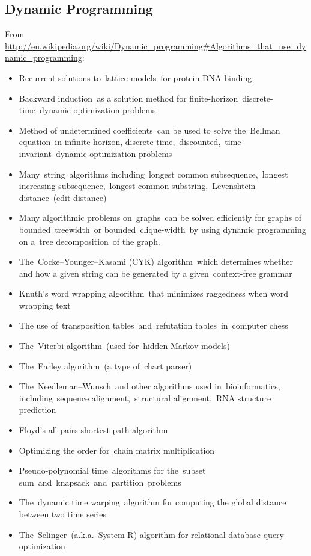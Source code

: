 \subsection{Dynamic Programming}
From \url{http://en.wikipedia.org/wiki/Dynamic_programming#Algorithms_that_use_dynamic_programming}:
\begin{itemize}
\item Recurrent solutions to lattice models for protein-DNA binding
\item Backward induction as a solution method for finite-horizon discrete-time dynamic optimization problems
\item Method of undetermined coefficients can be used to solve the Bellman equation in infinite-horizon, discrete-time, discounted, time-invariant dynamic optimization problems
\item Many string algorithms including longest common subsequence, longest increasing subsequence, longest common substring, Levenshtein distance (edit distance)
\item Many algorithmic problems on graphs can be solved efficiently for graphs of bounded treewidth or bounded clique-width by using dynamic programming on a tree decomposition of the graph.
\item The Cocke–Younger–Kasami (CYK) algorithm which determines whether and how a given string can be generated by a given context-free grammar
\item Knuth's word wrapping algorithm that minimizes raggedness when word wrapping text
\item The use of transposition tables and refutation tables in computer chess
\item The Viterbi algorithm (used for hidden Markov models)
\item The Earley algorithm (a type of chart parser)
\item The Needleman–Wunsch and other algorithms used in bioinformatics, including sequence alignment, structural alignment, RNA structure prediction
\item Floyd's all-pairs shortest path algorithm
\item Optimizing the order for chain matrix multiplication
\item Pseudo-polynomial time algorithms for the subset sum and knapsack and partition problems
\item The dynamic time warping algorithm for computing the global distance between two time series
\item The Selinger (a.k.a. System R) algorithm for relational database query optimization

\end{itemize}
